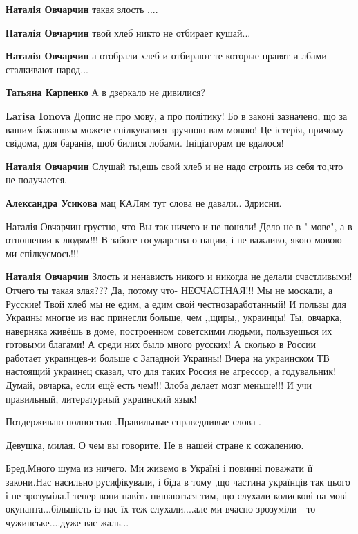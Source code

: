 \begin{itemize}
\begin{itemize}
\textbf{Наталія Овчарчин} такая злость ....

\textbf{Наталія Овчарчин} твой хлеб никто не отбирает кушай...

\textbf{Наталія Овчарчин} а отобрали хлеб и отбирают те которые правят и лбами сталкивают народ...

\textbf{Татьяна Карпенко} А в дзеркало не дивилися?

\textbf{Larisa Ionova} Допис не про мову, а про політику! Бо в законі
зазначено, що за вашим бажанням можете спілкуватися зручною вам мовою! Це
істерія, причому свідома, для баранів, щоб билися лобами. Ініціаторам це
вдалося!

\textbf{Наталія Овчарчин} Слушай ты,ешь свой хлеб и не надо строить из себя то,что не получается.

\textbf{Александра Усикова} мац КАЛям тут слова не давали.. Здрисни.

Наталія Овчарчин грустно, что Вы так ничего и не поняли! Дело не в " мове", а в
отношении к людям!!! В заботе государства о нации, і не важливо, якою мовою ми
спілкуємось!!!

\textbf{Наталія Овчарчин} Злость и ненависть никого и никогда не делали
счастливыми! Отчего ты такая злая??? Да, потому что- НЕСЧАСТНАЯ!!! Мы не
москали, а Русские! Твой хлеб мы не едим, а едим свой честнозаработанный! И
пользы для Украины многие из нас принесли больше, чем ,,щиры,, украинцы! Ты,
овчарка, наверняка живёшь в доме, построенном советскими людьми, пользуешься их
готовыми благами! А среди них было много русских! А сколько в России работает
украинцев-и больше с Западной Украины! Вчера на украинском ТВ настоящий
украинец сказал, что для таких Россия не агрессор, а годувальник! Думай,
овчарка, если ещё есть чем!!! Злоба делает мозг меньше!!! И учи правильный,
литературный украинский язык!
\end{itemize}


Потдерживаю полностью .Правильные справедливые слова .


Девушка, милая. О чем вы говорите. Не в нашей стране к сожалению.


Бред.Много шума из ничего. Ми живемо в Україні і повинні поважати її закони.Нас
насильно русифікували, і біда в тому ,що частина українців так цього і не
зрозуміла.І тепер вони навіть пишаються тим, що слухали колискові на мові
окупанта...більшість із нас їх теж слухали....але ми вчасно зрозуміли - то
чужинське....дуже вас жаль...


\end{itemize}

